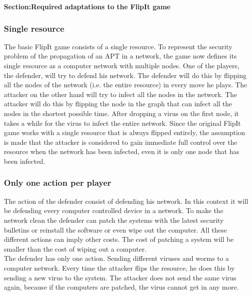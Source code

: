 \textbf{Section:Required adaptations to the FlipIt game}


\subsubsection{Single resource}
The basic FlipIt game consists of a single resource. To represent the security problem of the propagation of an APT in a network, the game now defines its single resource as a computer network with multiple
nodes. One of the players, the defender, will try to defend his network. The defender
will do this by flipping all the nodes of the network (i.e. the entire resource) in every move he plays. The
attacker on the other hand will try to infect all the nodes in the network. The attacker
will do this by flipping the node in the graph that can infect all the nodes in the
shortest possible time. After dropping a virus on the first node, it takes a while for the virus to infect the entire network. Since the original FlipIt game works with a single resource that is always flipped entirely, the assumption is made that the attacker is considered to gain immediate full control over the resource when the network has been infected, even it is only one node that has been infected.\\
\subsubsection{Only one action per player}


The action of the defender consist of defending his network. In this context it will be defending every computer controlled device in a network. To make the network clean the defender can patch the systems with the latest security bulletins or reinstall the software or even wipe out the computer. All these different actions can imply other costs. The cost of patching a system will be smaller than the cost of wiping out a computer. \\
The defender has only one action. Sending different viruses and worms to a computer network. Every time the attacker flips the resource, he does this by sending a new virus to the system. The attacker does not send the same virus again, because if the computers are patched, the virus cannot get in any more. 
